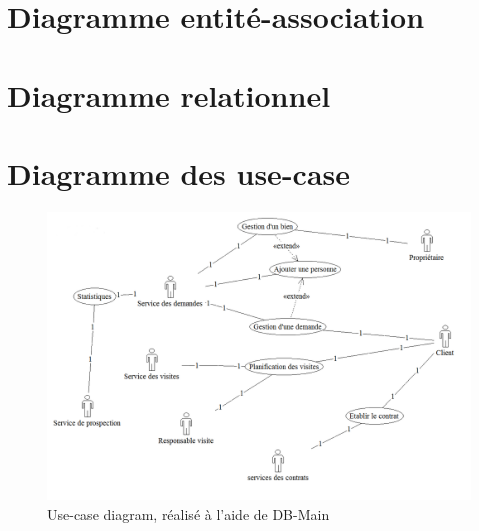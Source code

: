 \section{Diagramme entité-association}
\section{Diagramme relationnel}
\section{Diagramme des use-case}
\begin{figure}[H]
\centering
\includegraphics[width=16cm]{use-case.png}
\caption{Use-case diagram, réalisé à l'aide de DB-Main}
\end{figure}